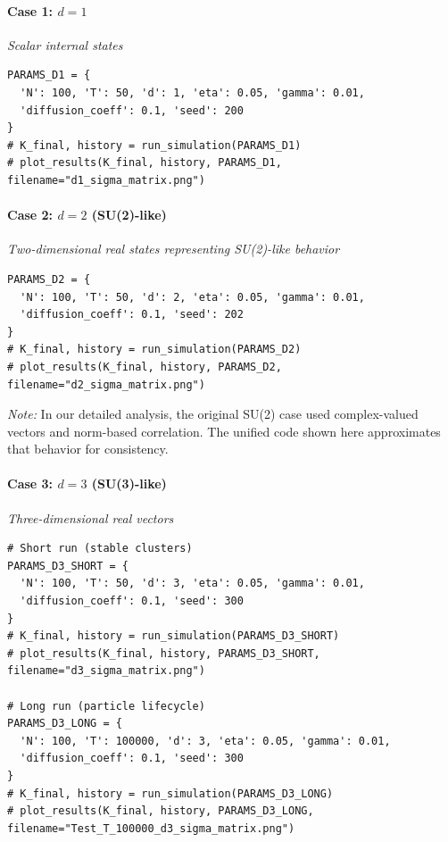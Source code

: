 \documentclass[12pt]{article}
\begin{document}
\paragraph{Case 1: $d=1$}
\textit{Scalar internal states}

\begin{verbatim}
PARAMS_D1 = {
  'N': 100, 'T': 50, 'd': 1, 'eta': 0.05, 'gamma': 0.01,
  'diffusion_coeff': 0.1, 'seed': 200
}
# K_final, history = run_simulation(PARAMS_D1)
# plot_results(K_final, history, PARAMS_D1, filename="d1_sigma_matrix.png")
\end{verbatim}

\paragraph{Case 2: $d=2$ (SU(2)-like)}
\textit{Two-dimensional real states representing SU(2)-like behavior}

\begin{verbatim}
PARAMS_D2 = {
  'N': 100, 'T': 50, 'd': 2, 'eta': 0.05, 'gamma': 0.01,
  'diffusion_coeff': 0.1, 'seed': 202
}
# K_final, history = run_simulation(PARAMS_D2)
# plot_results(K_final, history, PARAMS_D2, filename="d2_sigma_matrix.png")
\end{verbatim}

\textit{Note:} In our detailed analysis, the original SU(2) case used complex-valued vectors and norm-based correlation. The unified code shown here approximates that behavior for consistency.

\paragraph{Case 3: $d=3$ (SU(3)-like)}
\textit{Three-dimensional real vectors}

\begin{verbatim}
# Short run (stable clusters)
PARAMS_D3_SHORT = {
  'N': 100, 'T': 50, 'd': 3, 'eta': 0.05, 'gamma': 0.01,
  'diffusion_coeff': 0.1, 'seed': 300
}
# K_final, history = run_simulation(PARAMS_D3_SHORT)
# plot_results(K_final, history, PARAMS_D3_SHORT, filename="d3_sigma_matrix.png")

# Long run (particle lifecycle)
PARAMS_D3_LONG = {
  'N': 100, 'T': 100000, 'd': 3, 'eta': 0.05, 'gamma': 0.01,
  'diffusion_coeff': 0.1, 'seed': 300
}
# K_final, history = run_simulation(PARAMS_D3_LONG)
# plot_results(K_final, history, PARAMS_D3_LONG, filename="Test_T_100000_d3_sigma_matrix.png")
\end{verbatim}
\end{document}
